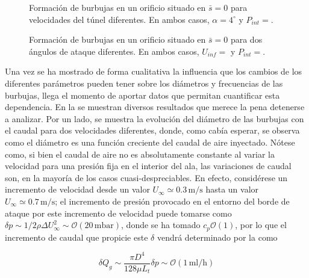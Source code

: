 \begin{figure}
\centering
{}
\caption{Formación de burbujas en un orificio situado en $\bar{s} = 0$ para velocidades del túnel diferentes. En ambos casos, $\alpha = 4^{\circ}$ y $P_{int} = $.}
\end{figure}

\begin{figure}
\centering
{}
\caption{Formación de burbujas en un orificio situado en $\bar{s} = 0$ para dos ángulos de ataque diferentes. En ambos casos, $U_{inf} = $ y $P_{int} = $.}
\end{figure}


Una vez se ha mostrado de forma cualitativa la influencia que los cambios de los diferentes parámetros pueden tener sobre los diámetros y frecuencias de las burbujas, llega el momento de aportar datos que permitan cuantificar esta dependencia. En la  se muestran diversos resultados que merece la pena detenerse a analizar.  Por un lado, se muestra la evolución del diámetro de las burbujas con el caudal para dos velocidades diferentes, donde, como cabía esperar, se observa como el diámetro es una función creciente del caudal de aire inyectado. Nótese como, si bien el caudal de aire no es absolutamente  constante al variar la velocidad para una presión fija en el interior del ala, las variaciones de caudal son, en la mayoría de los casos cuasi-despreciables. En efecto, considérese un incremento de velocidad desde un valor $U_{\infty} \simeq 0.3\,\mathrm{m/s}$ hasta un valor $U_{\infty} \simeq 0.7\,\mathrm{m/s}$; el incremento de presión provocado en el entorno del borde de ataque por este incremento de velocidad puede tomarse como $\delta p \sim 1/2\rho \Delta U_{\infty}^{2} \sim \mathcal{O}\left(20\,\mathrm{mbar}\right)$,  donde se ha tomado $c_{p} \mathcal{O}\left(1\right)$, por lo que el incremento de caudal que propicie este $\delta$ vendrá determinado por la  como

\begin{displaymath}
\delta Q_{g} \sim \dfrac{\pi D^{4}}{128 \mu L_{t}}\delta p \sim \mathcal{O}\left(1\, \mathrm{ml/h}\right)
\end{displaymath}

